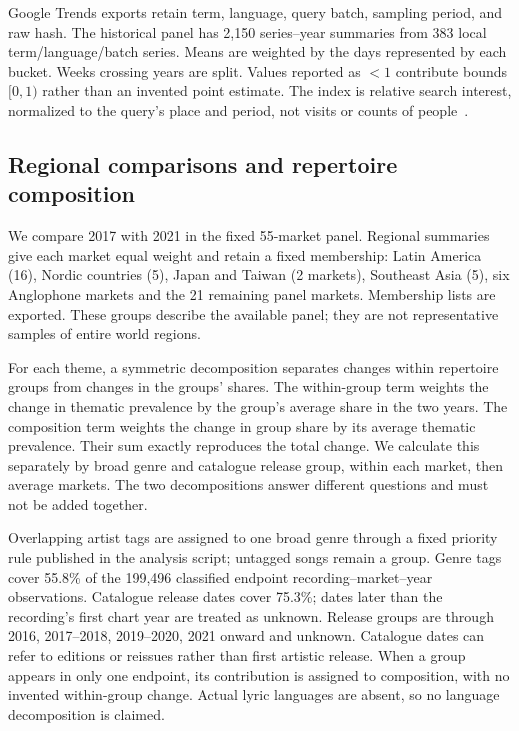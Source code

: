 \documentclass[10pt,a4paper,twocolumn]{article}
\begin{document}
Google Trends exports retain term, language, query batch, sampling period, and raw hash. The historical panel has 2,150 series--year summaries from 383 local term/language/batch series. Means are weighted by the days represented by each bucket. Weeks crossing years are split. Values reported as $<1$ contribute bounds $[0,1)$ rather than an invented point estimate. The index is relative search interest, normalized to the query's place and period, not visits or counts of people~\cite{trends}.

\subsection{Regional comparisons and repertoire composition}
We compare 2017 with 2021 in the fixed 55-market panel. Regional summaries give each market equal weight and retain a fixed membership: Latin America (16), Nordic countries (5), Japan and Taiwan (2 markets), Southeast Asia (5), six Anglophone markets and the 21 remaining panel markets. Membership lists are exported. These groups describe the available panel; they are not representative samples of entire world regions.

For each theme, a symmetric decomposition separates changes within repertoire groups from changes in the groups' shares. The within-group term weights the change in thematic prevalence by the group's average share in the two years. The composition term weights the change in group share by its average thematic prevalence. Their sum exactly reproduces the total change. We calculate this separately by broad genre and catalogue release group, within each market, then average markets. The two decompositions answer different questions and must not be added together.

Overlapping artist tags are assigned to one broad genre through a fixed priority rule published in the analysis script; untagged songs remain a group. Genre tags cover 55.8\% of the 199,496 classified endpoint recording--market--year observations. Catalogue release dates cover 75.3\%; dates later than the recording's first chart year are treated as unknown. Release groups are through 2016, 2017--2018, 2019--2020, 2021 onward and unknown. Catalogue dates can refer to editions or reissues rather than first artistic release. When a group appears in only one endpoint, its contribution is assigned to composition, with no invented within-group change. Actual lyric languages are absent, so no language decomposition is claimed.
\end{document}

